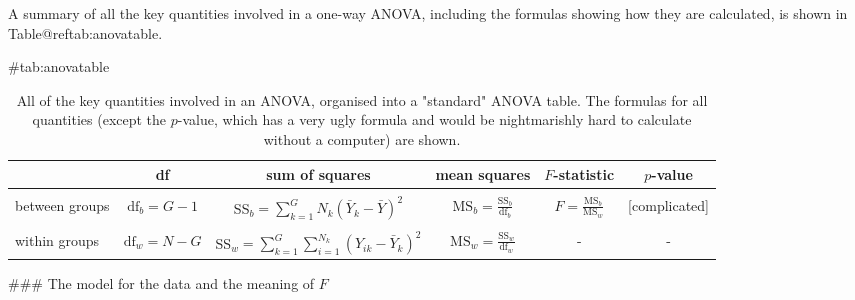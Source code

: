 A summary of all the key quantities involved in a one-way ANOVA, including the formulas showing how they are calculated, is shown in Table@reftab:anovatable. 
\begin{table}
\begin{center}
\caption{All of the key quantities involved in an ANOVA, organised into a "standard" ANOVA table. The formulas for all quantities (except the $p$-value, which has a very ugly formula and would be nightmarishly hard to calculate without a computer) are shown.} \tabcapsep
{#tab:anovatable}
\small
\begin{tabular}{l|c|c|c|c|c} 
& df & sum of squares & mean squares & $F$-statistic & $p$-value \\  \hline  &&&&& \\ 
between groups & $\mbox{df}_b = G-1$ & SS$_b = \displaystyle\sum_{k=1}^G N_k (\bar{Y}_k - \bar{Y})^2$ & $\mbox{MS}_b = \displaystyle\frac{\mbox{SS}_b}{\mbox{df}_b}$ & $ F = \displaystyle\frac{\mbox{MS}_b }{ \mbox{MS}_w }$ & [complicated] \\ &&&&&\\
within groups   & $\mbox{df}_w = N-G$ & SS$_w = \displaystyle\sum_{k=1}^G \displaystyle\sum_{i = 1}^{N_k} ( {Y}_{ik} - \bar{Y}_k)^2$ & $\mbox{MS}_w =  \displaystyle\frac{\mbox{SS}_w}{\mbox{df}_w}$ & - & - \\ 
\end{tabular}\tabcapsep
\HR
\end{center}
\end{table}

### The model for the data and the meaning of $F$ 

